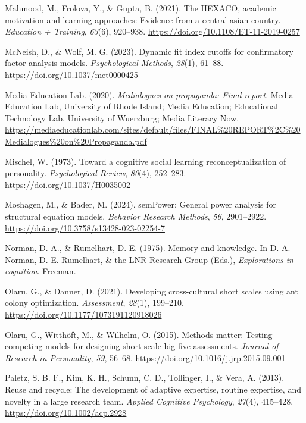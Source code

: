 \documentclass[
  12pt,
  a4paper,
  twoside]{article}
\newlength{\cslhangindent}
\newenvironment{CSLReferences}[2] %
 {\begin{list}{}{%
  \setlength{\itemindent}{0pt}
  \setlength{\leftmargin}{0pt}
  \setlength{\parsep}{0pt}
  \ifodd #1
   \setlength{\leftmargin}{\cslhangindent}
   \setlength{\itemindent}{-1\cslhangindent}
  \fi
  \setlength{\itemsep}{#2\baselineskip}}}
 {\end{list}}
\begin{document}
\begin{CSLReferences}{1}{0}
Mahmood, M., Frolova, Y., \& Gupta, B. (2021). The HEXACO, academic motivation and learning approaches: Evidence from a central asian country. \emph{Education + Training}, \emph{63}(6), 920--938. \url{https://doi.org/10.1108/ET-11-2019-0257}

McNeish, D., \& Wolf, M. G. (2023). Dynamic fit index cutoffs for confirmatory factor analysis models. \emph{Psychological Methods}, \emph{28}(1), 61--88. \url{https://doi.org/10.1037/met0000425}

Media Education Lab. (2020). \emph{Medialogues on propaganda: Final report}. Media Education Lab, University of Rhode Island; Media Education; Educational Technology Lab, University of Wuerzburg; Media Literacy Now. \url{https://mediaeducationlab.com/sites/default/files/FINAL\%20REPORT\%2C\%20Medialogues\%20on\%20Propaganda.pdf}

Mischel, W. (1973). Toward a cognitive social learning reconceptualization of personality. \emph{Psychological Review}, \emph{80}(4), 252--283. \url{https://doi.org/10.1037/H0035002}

Moshagen, M., \& Bader, M. (2024). semPower: General power analysis for structural equation models. \emph{Behavior Research Methods}, \emph{56}, 2901--2922. \url{https://doi.org/10.3758/s13428-023-02254-7}

Norman, D. A., \& Rumelhart, D. E. (1975). Memory and knowledge. In D. A. Norman, D. E. Rumelhart, \& the LNR Research Group (Eds.), \emph{Explorations in cognition}. Freeman.

Olaru, G., \& Danner, D. (2021). Developing cross-cultural short scales using ant colony optimization. \emph{Assessment}, \emph{28}(1), 199--210. \url{https://doi.org/10.1177/1073191120918026}

Olaru, G., Witthöft, M., \& Wilhelm, O. (2015). Methods matter: Testing competing models for designing short-scale big five assessments. \emph{Journal of Research in Personality}, \emph{59}, 56--68. \url{https://doi.org/10.1016/j.jrp.2015.09.001}

Paletz, S. B. F., Kim, K. H., Schunn, C. D., Tollinger, I., \& Vera, A. (2013). Reuse and recycle: The development of adaptive expertise, routine expertise, and novelty in a large research team. \emph{Applied Cognitive Psychology}, \emph{27}(4), 415--428. \url{https://doi.org/10.1002/acp.2928}


\end{CSLReferences}
\end{document}
